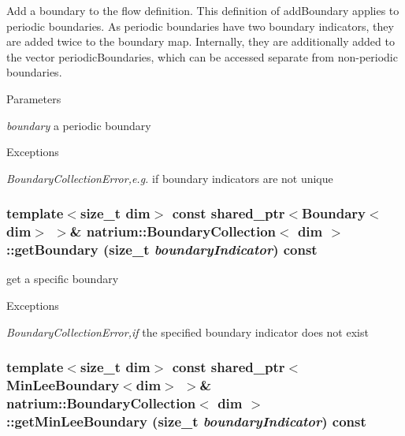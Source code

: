 Add a boundary to the flow definition. This definition of addBoundary applies to periodic boundaries. As periodic boundaries have two boundary indicators, they are added twice to the boundary map. Internally, they are additionally added to the vector periodicBoundaries, which can be accessed separate from non-\/periodic boundaries. 
\begin{DoxyParams}{Parameters}
\item[{\em boundary}]a periodic boundary \end{DoxyParams}

\begin{DoxyExceptions}{Exceptions}
\item[{\em BoundaryCollectionError,e.g.}]if boundary indicators are not unique \end{DoxyExceptions}
\hypertarget{classnatrium_1_1BoundaryCollection_adacc8205b74bdc7344161e73f1acadca}{
\subsubsection[{getBoundary}]{\setlength{\rightskip}{0pt plus 5cm}template$<$size\_\-t dim$>$ const shared\_\-ptr$<${\bf Boundary}$<$dim$>$ $>$\& {\bf natrium::BoundaryCollection}$<$ dim $>$::getBoundary (size\_\-t {\em boundaryIndicator}) const}}
\label{classnatrium_1_1BoundaryCollection_adacc8205b74bdc7344161e73f1acadca}


get a specific boundary 
\begin{DoxyExceptions}{Exceptions}
\item[{\em BoundaryCollectionError,if}]the specified boundary indicator does not exist \end{DoxyExceptions}
\hypertarget{classnatrium_1_1BoundaryCollection_aea35fe9645fc3521da83ae83ef84967b}{
\subsubsection[{getMinLeeBoundary}]{\setlength{\rightskip}{0pt plus 5cm}template$<$size\_\-t dim$>$ const shared\_\-ptr$<${\bf MinLeeBoundary}$<$dim$>$ $>$\& {\bf natrium::BoundaryCollection}$<$ dim $>$::getMinLeeBoundary (size\_\-t {\em boundaryIndicator}) const}}
\label{classnatrium_1_1BoundaryCollection_aea35fe9645fc3521da83ae83ef84967b}


